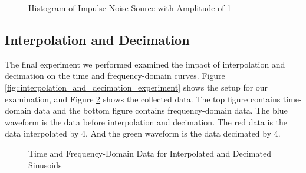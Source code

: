 \documentclass{article}
\begin{document}
\begin{figure}[H]
	\centerline{}
	\caption{Histogram of Impulse Noise Source with Amplitude of 1}
	\label{fig::impulse_noise_histogram}
\end{figure}

\subsection{Interpolation and Decimation}

The final experiment we performed examined the impact of interpolation and decimation on the time and frequency-domain curves. Figure \ref{fig::interpolation_and_decimation_experiment} shows the setup for our examination, and Figure \ref{fig::interpolation_and_decimation_waveforms} shows the collected data. The top figure contains time-domain data and the bottom figure contains frequency-domain data. The blue waveform is the data before interpolation and decimation. The red data is the data interpolated by 4. And the green waveform is the data decimated by 4.

\begin{figure}[H]
	\centerline{}
	\caption{Time and Frequency-Domain Data for Interpolated and Decimated Sinusoids}
	\label{fig::interpolation_and_decimation_waveforms}
\end{figure}
\end{document}
